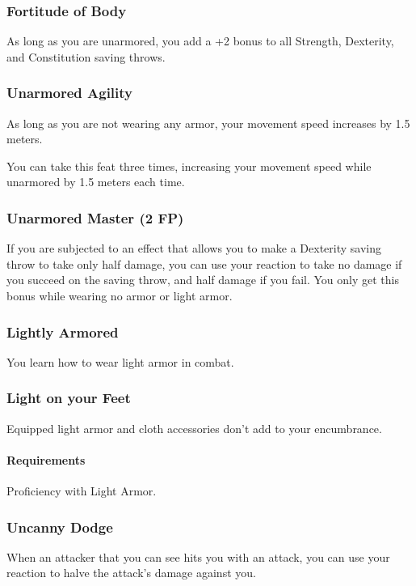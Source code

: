 \subsubsection{Fortitude of Body} \label{feat::fortitudeofbody}
    As long as you are unarmored, you add a +2 bonus to all Strength, Dexterity, and Constitution saving throws.
\subsubsection{Unarmored Agility} \label{feat::unarmoredagility}
    As long as you are not wearing any armor, your movement speed increases by 1.5 meters.

    You can take this feat three times, increasing your movement speed while unarmored by 1.5 meters each time.
\subsubsection{Unarmored Master (2 FP)} \label{feat::unarmoredmaster}
    If you are subjected to an effect that allows you to make a Dexterity saving throw to take only half damage, you can use your reaction to take no damage if you succeed on the saving throw, and half damage if you fail.
    You only get this bonus while wearing no armor or light armor.
\subsubsection{Lightly Armored} \label{feat::lightlyarmored}
    You learn how to wear light armor in combat.
\subsubsection{Light on your Feet} \label{feat::lightonyourfeet}
    Equipped light armor and cloth accessories don't add to your encumbrance.
    \paragraph{Requirements} Proficiency with Light Armor.
\subsubsection{Uncanny Dodge} \label{feat::uncannydodge}
    When an attacker that you can see hits you with an attack, you can use your reaction to halve the attack's damage against you.

